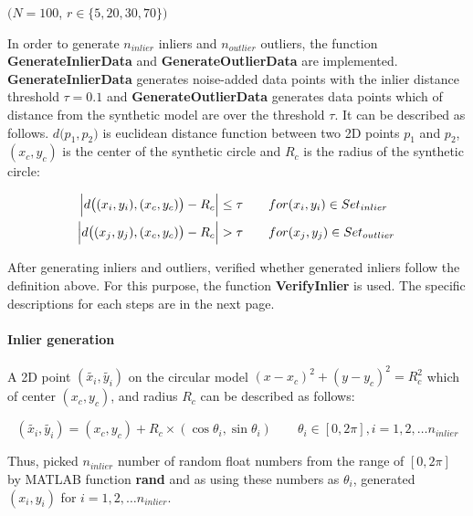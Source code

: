 \documentclass[paper=a4, fontsize=11pt]{scrartcl} %
\numberwithin{equation}{section} %
\numberwithin{figure}{section} %
\numberwithin{table}{section} %
\newcommand{\funcname}[1]{\textbf{#1}}
\begin{document}
\begin{center}
$(N = 100$, $r \in \{5, 20, 30, 70\})$
\end{center}

In order to generate $n_{inlier}$ inliers and $n_{outlier}$ outliers, the function \funcname{GenerateInlierData} and \funcname{GenerateOutlierData} are implemented. \funcname{GenerateInlierData} generates noise-added data points with the inlier distance threshold $\tau = 0.1$ and \funcname{GenerateOutlierData} generates data points which of distance from the synthetic model are over the threshold $\tau$. It can be described as follows. $d\big(p_{1}, p_{2}\big)$ is euclidean distance function between two 2D points $p_{1}$ and $p_{2}$, $(x_{c}, y_{c})$ is the center of the synthetic circle and $R_{c}$ is the radius of the synthetic circle:

\begin{align*}
\abs{d \big( (x_{i}, y_{i}), (x_{c}, y_{c}) \big) - R_{c}} &\leq \tau  \qquad for (x_{i}, y_{i}) \in Set_{inlier} \\
\abs{d \big( (x_{j}, y_{j}), (x_{c}, y_{c}) \big) - R_{c}} &> \tau \qquad for (x_{j}, y_{j}) \in Set_{outlier} 
\end{align*}


After generating inliers and outliers, verified whether generated inliers follow the definition above. For this purpose, the function \funcname{VerifyInlier} is used. The specific descriptions for each steps are in the next page.

\paragraph{Inlier generation}

A 2D point $(\tilde{x_{i}}, \tilde{y_{i}})$ on the circular model $(x-x_{c})^{2} + (y-y_c)^{2} = R_{c}^{2}$ which of center $(x_{c}, y_{c})$, and radius $R_{c}$ can be described as follows:

\begin{equation*}
(\tilde{x_{i}}, \tilde{y_{i}}) = (x_{c}, y_{c}) + R_{c} \times (\cos \theta_{i}, \sin \theta_{i}) \qquad \theta_{i} \in [0, 2 \pi], i = 1, 2, \dots n_{inlier}
\end{equation*}

Thus, picked $n_{inlier}$ number of random float numbers from the range of  $[0, 2 \pi]$ by MATLAB function \funcname{rand} and as using these numbers as $\theta_{i}$, generated $(x_{i}, y_{i})$ for $i = 1, 2, \dots n_{inlier}$.  
\end{document}

